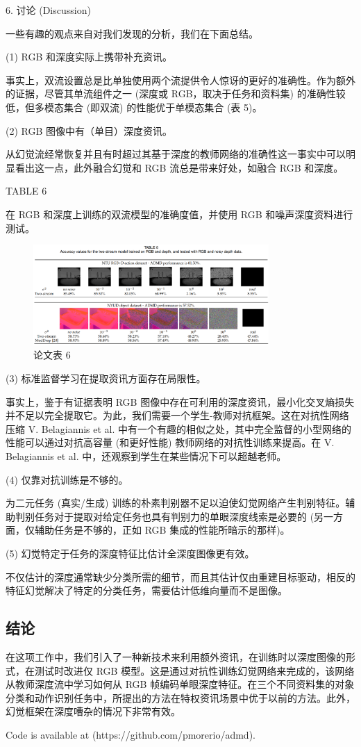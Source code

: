 6. 讨论 (Discussion) 

一些有趣的观点来自对我们发现的分析，我们在下面总结。

(1) RGB 和深度实际上携带补充资讯。

事实上，双流设置总是比单独使用两个流提供令人惊讶的更好的准确性。作为额外的证据，尽管其单流组件之一 (深度或 RGB，取决于任务和资料集) 的准确性较低，但多模态集合 (即双流) 的性能优于单模态集合 (表 5)。

(2) RGB 图像中有（单目）深度资讯。

从幻觉流经常恢复并且有时超过其基于深度的教师网络的准确性这一事实中可以明显看出这一点，此外融合幻觉和 RGB 流总是带来好处，如融合 RGB 和深度。


TABLE 6

在 RGB 和深度上训练的双流模型的准确度值，并使用 RGB 和噪声深度资料进行测试。

\begin{figure}[htb]
\centering 
\includegraphics[width=0.80\textwidth]{img/c1m11.png} 
\caption{论文表 6}
\label{Test}
\end{figure}

(3) 标准监督学习在提取资讯方面存在局限性。

事实上，鉴于有证据表明 RGB 图像中存在可利用的深度资讯，最小化交叉熵损失并不足以完全提取它。为此，我们需要一个学生-教师对抗框架。这在对抗性网络压缩 V. Belagiannis et al. 中有一个有趣的相似之处，其中完全监督的小型网络的性能可以通过对抗高容量 (和更好性能) 教师网络的对抗性训练来提高。在 V. Belagiannis et al. 中，还观察到学生在某些情况下可以超越老师。

(4) 仅靠对抗训练是不够的。

为二元任务 (真实/生成) 训练的朴素判别器不足以迫使幻觉网络产生判别特征。辅助判别任务对于提取对给定任务也具有判别力的单眼深度线索是必要的 (另一方面，仅辅助任务是不够的，正如 RGB 集成的性能所暗示的那样)。

(5) 幻觉特定于任务的深度特征比估计全深度图像更有效。

不仅估计的深度通常缺少分类所需的细节，而且其估计仅由重建目标驱动，相反的特征幻觉解决了特定的分类任务，需要估计低维向量而不是图像。

\subsection{结论}

在这项工作中，我们引入了一种新技术来利用额外资讯，在训练时以深度图像的形式，在测试时改进仅 RGB 模型。这是通过对抗性训练幻觉网络来完成的，该网络从教师深度流中学习如何从 RGB 帧编码单眼深度特征。在三个不同资料集的对象分类和动作识别任务中，所提出的方法在特权资讯场景中优于以前的方法。此外，幻觉框架在深度嘈杂的情况下非常有效。

Code is available at (https://github.com/pmorerio/admd).